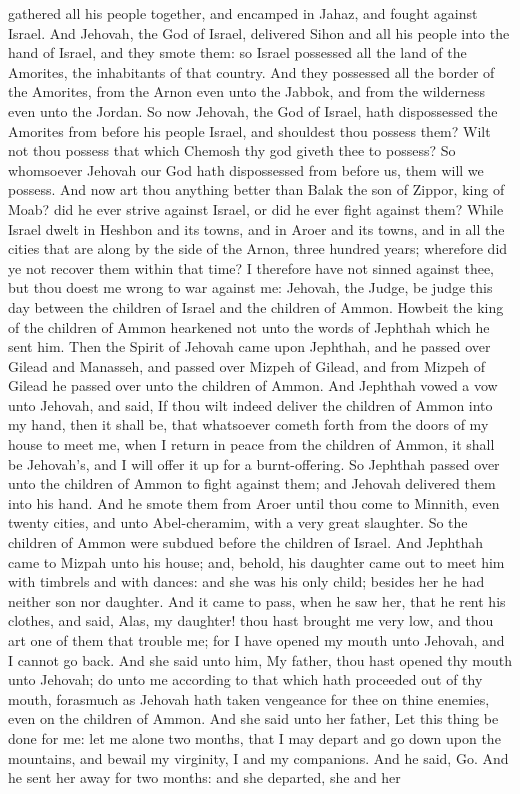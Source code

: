 gathered all his people together, and encamped in Jahaz, and fought against Israel. And Jehovah, the God of Israel, delivered Sihon and all his people into the hand of Israel, and they smote them: so Israel possessed all the land of the Amorites, the inhabitants of that country. And they possessed all the border of the Amorites, from the Arnon even unto the Jabbok, and from the wilderness even unto the Jordan. So now Jehovah, the God of Israel, hath dispossessed the Amorites from before his people Israel, and shouldest thou possess them? Wilt not thou possess that which Chemosh thy god giveth thee to possess? So whomsoever Jehovah our God hath dispossessed from before us, them will we possess. And now art thou anything better than Balak the son of Zippor, king of Moab? did he ever strive against Israel, or did he ever fight against them? While Israel dwelt in Heshbon and its towns, and in Aroer and its towns, and in all the cities that are along by the side of the Arnon, three hundred years; wherefore did ye not recover them within that time? I therefore have not sinned against thee, but thou doest me wrong to war against me: Jehovah, the Judge, be judge this day between the children of Israel and the children of Ammon. Howbeit the king of the children of Ammon hearkened not unto the words of Jephthah which he sent him.  Then the Spirit of Jehovah came upon Jephthah, and he passed over Gilead and Manasseh, and passed over Mizpeh of Gilead, and from Mizpeh of Gilead he passed over unto the children of Ammon. And Jephthah vowed a vow unto Jehovah, and said, If thou wilt indeed deliver the children of Ammon into my hand, then it shall be, that whatsoever cometh forth from the doors of my house to meet me, when I return in peace from the children of Ammon, it shall be Jehovah’s, and I will offer it up for a burnt-offering. So Jephthah passed over unto the children of Ammon to fight against them; and Jehovah delivered them into his hand. And he smote them from Aroer until thou come to Minnith, even twenty cities, and unto Abel-cheramim, with a very great slaughter. So the children of Ammon were subdued before the children of Israel.  And Jephthah came to Mizpah unto his house; and, behold, his daughter came out to meet him with timbrels and with dances: and she was his only child; besides her he had neither son nor daughter. And it came to pass, when he saw her, that he rent his clothes, and said, Alas, my daughter! thou hast brought me very low, and thou art one of them that trouble me; for I have opened my mouth unto Jehovah, and I cannot go back. And she said unto him, My father, thou hast opened thy mouth unto Jehovah; do unto me according to that which hath proceeded out of thy mouth, forasmuch as Jehovah hath taken vengeance for thee on thine enemies, even on the children of Ammon. And she said unto her father, Let this thing be done for me: let me alone two months, that I may depart and go down upon the mountains, and bewail my virginity, I and my companions. And he said, Go. And he sent her away for two months: and she departed, she and her 